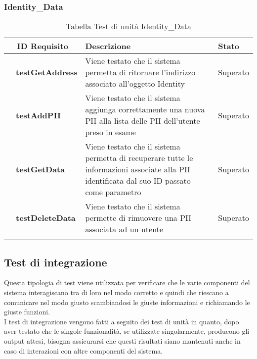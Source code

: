 \subsubsection{Identity\_Data}
\begin{longtable}{|r l|p{10cm}|p{2cm}|}
	\hline
	\multicolumn{2}{|c|}{\textbf{ID Requisito}} & \textbf{Descrizione} & \textbf{Stato}\tabularnewline
	\hline
	&\textbf{testGetAddress}&Viene testato che il sistema permetta di ritornare l'indirizzo associato all'oggetto Identity& Superato\\\hline
	&\textbf{testAddPII}&Viene testato che il sistema aggiunga correttamente una nuova \gls{PII} alla lista delle \gls{PII} dell'utente preso in esame& Superato\\\hline
	&\textbf{testGetData}&Viene testato che il sistema permetta di recuperare tutte le informazioni associate alla \gls{PII} identificata dal suo ID passato come parametro& Superato\\\hline
	&\textbf{testDeleteData}&Viene testato che il sistema permette di rimuovere una \gls{PII} associata ad un utente& Superato\\\hline
	\caption{Tabella Test di unità Identity\_Data}
\end{longtable}
\subsection{Test di integrazione}
Questa tipologia di test viene utilizzata per verificare che le varie componenti del sistema interagiscano tra di loro nel modo corretto e quindi che riescano a comunicare nel modo giusto scambiandosi le giuste informazioni e richiamando le giuste funzioni.\\
I test di integrazione vengono fatti a seguito dei test di unità in quanto, dopo aver testato che le singole funzionalità, se utilizzate singolarmente, producono gli output attesi, bisogna assicurarsi che questi risultati siano mantenuti anche in caso di interazioni con altre componenti del sistema.
